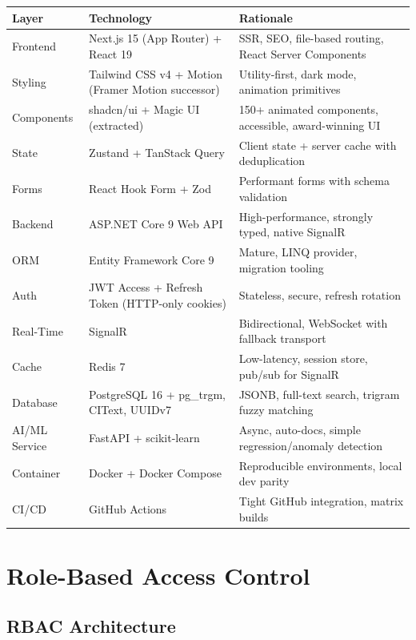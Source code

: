 \documentclass[12pt,a4paper,twoside]{report}
\begin{document}
\begin{longtable}{lll}
\toprule
\textbf{Layer} & \textbf{Technology} & \textbf{Rationale} \\
\midrule
\endhead
\bottomrule
\endfoot
Frontend       & Next.js 15 (App Router) + React 19 & SSR, SEO, file-based routing, React Server Components \\
Styling        & Tailwind CSS v4 + Motion (Framer Motion successor) & Utility-first, dark mode, animation primitives \\
Components     & shadcn/ui + Magic UI (extracted) & 150+ animated components, accessible, award-winning UI \\
State          & Zustand + TanStack Query & Client state + server cache with deduplication \\
Forms          & React Hook Form + Zod & Performant forms with schema validation \\
Backend        & ASP.NET Core 9 Web API & High-performance, strongly typed, native SignalR \\
ORM            & Entity Framework Core 9 & Mature, LINQ provider, migration tooling \\
Auth           & JWT Access + Refresh Token (HTTP-only cookies) & Stateless, secure, refresh rotation \\
Real-Time      & SignalR & Bidirectional, WebSocket with fallback transport \\
Cache          & Redis 7 & Low-latency, session store, pub/sub for SignalR \\
Database       & PostgreSQL 16 + pg\_trgm, CIText, UUIDv7 & JSONB, full-text search, trigram fuzzy matching \\
AI/ML Service  & FastAPI + scikit-learn & Async, auto-docs, simple regression/anomaly detection \\
Container      & Docker + Docker Compose & Reproducible environments, local dev parity \\
CI/CD          & GitHub Actions & Tight GitHub integration, matrix builds \\
\bottomrule
\end{longtable}

\chapter{Role-Based Access Control}

\section{RBAC Architecture}
\end{document}

